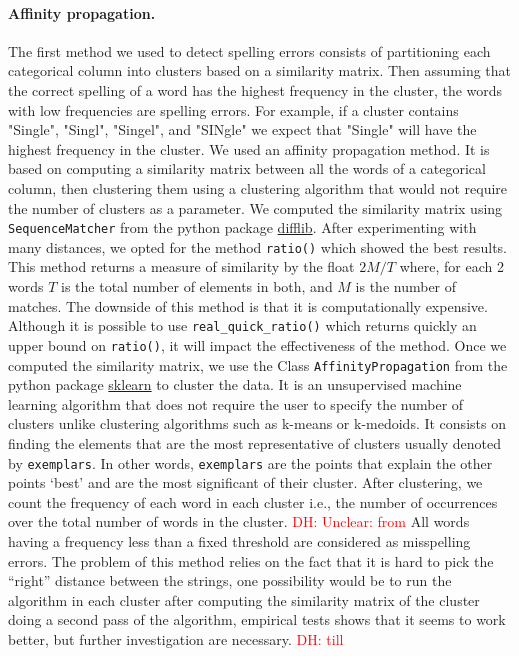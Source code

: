\documentclass{article}
\newcommand\dhawat[1]{\textcolor{red}{DH: #1}}
\begin{document}
\paragraph{ Affinity propagation.}
\label{sub:Affinity propagation algorithm}
The first method we used to detect spelling errors consists of partitioning each categorical column into clusters based on a similarity matrix.
Then assuming that the correct spelling of a word has the highest frequency in the cluster, the words with low frequencies are spelling errors.
For example, if a cluster contains "Single", "Singl", "Singel", and "SINgle" we expect that "Single" will have the highest frequency in the cluster.
We used an affinity propagation method.
It is based on computing a similarity matrix between all the words of a categorical column, then clustering them using a clustering algorithm that would not require the number of clusters as a parameter.
We computed the similarity matrix using \texttt{SequenceMatcher} from the python package \href{https://docs.python.org/3/library/difflib.html}{difflib}.
After experimenting with many distances, we opted for the method \texttt{ratio()} which showed the best results.
This method returns a measure of similarity by the float $2M /T$ where, for each 2 words $T$ is the total number of elements in both, and $M$ is the number of matches.
The downside of this method is that it is computationally expensive.
Although it is possible to use \texttt{real\_quick\_ratio()} which returns quickly an upper bound on \texttt{ratio()}, it will impact the effectiveness of the method. Once we computed the similarity matrix, we use the Class \texttt{AffinityPropagation} from the python package \href{https://scikit-learn.org/stable/modules/generated/sklearn.cluster.AffinityPropagation.html#sklearn-cluster-affinitypropagation}{sklearn} to cluster the data.
It is an unsupervised machine learning algorithm that does not require the user to specify the number of clusters unlike clustering algorithms such as k-means or k-medoids.
It consists on finding the elements that are the most representative of clusters usually denoted by \texttt{exemplars}.
In other words, \texttt{exemplars} are the points that explain the other points ‘best’ and are the most significant of their cluster.
After clustering, we count the frequency of each word in each cluster i.e., the number of occurrences over the total number of words in the cluster.
\dhawat{Unclear: from} All words having a frequency less than a fixed threshold are considered as misspelling errors.
The problem of this method relies on the fact that it is hard to pick the ``right'' distance between the strings, one possibility would be to run the algorithm in each cluster after computing the similarity matrix of the cluster doing a second pass of the algorithm, empirical tests shows that it seems to work better, but further investigation are necessary. \dhawat{till}
\end{document}
